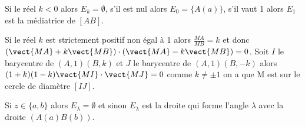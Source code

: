 Si le réel $k<0$ alors $E_k=\emptyset$, s'il est nul alors $E_0=\{A(a)\}$, s'il vaut 1 alors $E_1$ est la médiatrice de $[AB]$. 

Si le réel $k$ est strictement positif non égal à 1 alors $\frac{MA}{MB}=k$ et donc $(\vect{MA}+k\vect{MB}) \cdot (\vect{MA}-k\vect{MB})=0$. Soit $I$ le barycentre de $(A,1)(B,k)$ et $J$ le barycentre de $(A,1)(B,-k)$ alors $(1+k)(1-k) \vect{MI} \cdot \vect{MJ} =0$ comme $k \neq \pm 1$ on a que M est sur le cercle de diamètre $[IJ]$.

Si $z \in \{a,b\}$ alors $E_\lambda=\emptyset$ et sinon $E_\lambda$ est la droite qui forme l'angle $\lambda$ avec la droite $(A(a)B(b))$. 
